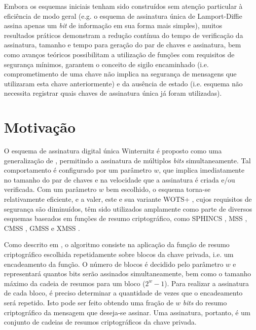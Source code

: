 \documentclass[12pt]{article}
\begin{document}
Embora os esquemas iniciais tenham sido construídos sem atenção particular à
eficiência de modo geral (e.g. o esquema de assinatura única de Lamport-Diffie
\cite{Lamport1979} assina apenas um \emph{bit} de informação em sua forma mais
simples), muitos resultados práticos demonstram a redução contínua do tempo de
verificação da assinatura, tamanho e tempo para geração do par de chaves e
assinatura, bem como avanços teóricos possibilitam a utilização de funções com
requisitos de segurança mínimos, garantem o conceito de sigilo encaminhado
\cite{Buchmann:2011:XPF:2184003.2184011} (i.e. comprometimento de uma chave não
implica na segurança de mensagens que utilizaram esta chave anteriormente) e da
ausência de estado \cite{Bernstein2015} (i.e. esquema não necessita registrar
quais chaves de assinatura única já foram utilizadas).

\section{Motivação}

O esquema de assinatura digital única Winternitz é proposto como uma
generalização de \cite{Lamport1979}, permitindo a assinatura de múltiplos
\emph{bits} simultaneamente. Tal comportamento é configurado por um parâmetro
$w$, que implica imediatamente no tamanho do par de chaves e na velocidade que
a assinatura é criada e/ou verificada. Com um parâmetro $w$ bem escolhido, o
esquema torna-se relativamente eficiente, e a valer, este e sua variante WOTS+
\cite{cryptoeprint:2017:965}, cujos requisitos de segurança são diminuídos, têm
sido utilizados amplamente como parte de diversos esquemas baseados em funções
de resumo criptográfico, como SPHINCS \cite{Bernstein2015}, MSS
\cite{Merkle:1989:CDS:118209.118230}, CMSS \cite{Buchmann2006}, GMSS
\cite{Buchmann2007} e XMSS \cite{Buchmann:2011:XPF:2184003.2184011}.

Como descrito em \cite{Bernstein:2008:PQC:1522375}, o algoritmo consiste na
aplicação da função de resumo criptográfico escolhida repetidamente sobre
blocos da chave privada, i.e. um encadeamento da função. O número de blocos é
decidido pelo parâmetro $w$ e representará quantos bits serão assinados
simultaneamente, bem como o tamanho máximo da cadeia de resumos para um bloco
($2^w - 1$). Para realizar a assinatura de cada bloco, é preciso determinar a
quantidade de vezes que o encadeamento será repetido. Isto pode ser feito
obtendo uma fração de $w$ \emph{bits} do resumo criptográfico da mensagem que
deseja-se assinar. Uma assinatura, portanto, é um conjunto de cadeias de
resumos criptográficos da chave privada.
\end{document}
